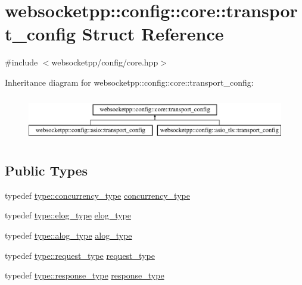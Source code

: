 \hypertarget{structwebsocketpp_1_1config_1_1core_1_1transport__config}{}\section{websocketpp\+:\+:config\+:\+:core\+:\+:transport\+\_\+config Struct Reference}
\label{structwebsocketpp_1_1config_1_1core_1_1transport__config}


{\ttfamily \#include $<$websocketpp/config/core.\+hpp$>$}

Inheritance diagram for websocketpp\+:\+:config\+:\+:core\+:\+:transport\+\_\+config\+:\begin{figure}[H]
\begin{center}
\leavevmode
\includegraphics[height=2.000000cm]{structwebsocketpp_1_1config_1_1core_1_1transport__config}
\end{center}
\end{figure}
\subsection*{Public Types}
\begin{DoxyCompactItemize}
\item 
typedef \hyperlink{structwebsocketpp_1_1config_1_1core_a894e9dea6f10e890ea21a687607c2f70}{type\+::concurrency\+\_\+type} \hyperlink{structwebsocketpp_1_1config_1_1core_1_1transport__config_a373a58261c0eaf203726b6a62436362a}{concurrency\+\_\+type}
\item 
typedef \hyperlink{structwebsocketpp_1_1config_1_1core_ac037ffb73b675a6251f3b86433b4eb17}{type\+::elog\+\_\+type} \hyperlink{structwebsocketpp_1_1config_1_1core_1_1transport__config_ae7514c1c62b41184ec7133de469ab3ae}{elog\+\_\+type}
\item 
typedef \hyperlink{structwebsocketpp_1_1config_1_1core_a3b2c116aa4077f10b085f008b48028e2}{type\+::alog\+\_\+type} \hyperlink{structwebsocketpp_1_1config_1_1core_1_1transport__config_aba152072bfdf296a067d5f860401824d}{alog\+\_\+type}
\item 
typedef \hyperlink{structwebsocketpp_1_1config_1_1core_a6b17eee7cb81f247afc8f3d7b3a3fc9e}{type\+::request\+\_\+type} \hyperlink{structwebsocketpp_1_1config_1_1core_1_1transport__config_aab3b5759b5b1f8c06da99319612c061c}{request\+\_\+type}
\item 
typedef \hyperlink{structwebsocketpp_1_1config_1_1core_a08e9a1d498f9002cbabcb1102df6005b}{type\+::response\+\_\+type} \hyperlink{structwebsocketpp_1_1config_1_1core_1_1transport__config_a93430d48551cc6d5cdee09d54840eb76}{response\+\_\+type}
\end{DoxyCompactItemize}
